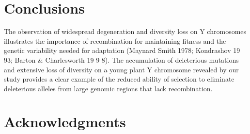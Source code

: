\documentclass[9pt,twocolumn,twoside]{gsajnl}
\begin{document}
\section*{Conclusions}

The observation of widespread degeneration and diversity loss on Y chromosomes illustrates the importance of recombination for maintaining fitness and the genetic variability needed for adaptation (Maynard Smith 1978; Kondrashov 19 93; Barton & Charlesworth 19 9 8). The accumulation of deleterious mutations and extensive loss of diversity on a young plant Y chromosome revealed by our study provides a clear example of the reduced ability of selection to eliminate deleterious alleles from large genomic regions that lack recombination.

\section*{Acknowledgments}



\end{document}
